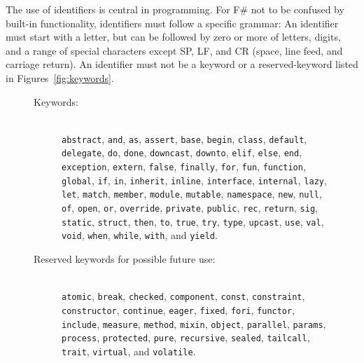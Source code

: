 The use of identifiers is central in programming. For F\# not to be confused by built-in functionality, identifiers must follow a specific grammar: An identifier must start with a letter, but can be followed by zero or more of letters, digits, and a range of special characters except SP, LF, and CR (space, line feed, and carriage return). An identifier must not be a keyword or a reserved-keyword listed in Figures~\ref{fig:keywords}.
\begin{figure}
  \begin{description}
  \item[Keywords:]~\\
    \mbox{\lstinline{abstract},} \mbox{\lstinline{and},} \mbox{\lstinline{as},} \mbox{\lstinline{assert},} \mbox{\lstinline{base},} \mbox{\lstinline{begin},} \mbox{\lstinline{class},} \mbox{\lstinline{default},} \mbox{\lstinline{delegate},} \mbox{\lstinline{do},} \mbox{\lstinline{done},} \mbox{\lstinline{downcast},} \mbox{\lstinline{downto},} \mbox{\lstinline{elif},} \mbox{\lstinline{else},} \mbox{\lstinline{end},} \mbox{\lstinline{exception},} \mbox{\lstinline{extern},} \mbox{\lstinline{false},} \mbox{\lstinline{finally},} \mbox{\lstinline{for},} \mbox{\lstinline{fun},} \mbox{\lstinline{function},} \mbox{\lstinline{global},} \mbox{\lstinline{if},} \mbox{\lstinline{in},} \mbox{\lstinline{inherit},} \mbox{\lstinline{inline},} \mbox{\lstinline{interface},} \mbox{\lstinline{internal},} \mbox{\lstinline{lazy},} \mbox{\lstinline{let},} \mbox{\lstinline{match},} \mbox{\lstinline{member},} \mbox{\lstinline{module},} \mbox{\lstinline{mutable},} \mbox{\lstinline{namespace},} \mbox{\lstinline{new},} \mbox{\lstinline{null},} \mbox{\lstinline{of},} \mbox{\lstinline{open},} \mbox{\lstinline{or},} \mbox{\lstinline{override},} \mbox{\lstinline{private},} \mbox{\lstinline{public},} \mbox{\lstinline{rec},} \mbox{\lstinline{return},} \mbox{\lstinline{sig},} \mbox{\lstinline{static},} \mbox{\lstinline{struct},} \mbox{\lstinline{then},} \mbox{\lstinline{to},} \mbox{\lstinline{true},} \mbox{\lstinline{try},} \mbox{\lstinline{type},} \mbox{\lstinline{upcast},} \mbox{\lstinline{use},} \mbox{\lstinline{val},} \mbox{\lstinline{void},} \mbox{\lstinline{when},} \mbox{\lstinline{while},} \mbox{\lstinline{with},} and \mbox{\lstinline{yield}.}
  \item[Reserved keywords for possible future use:]~\\
    \mbox{\lstinline{atomic},} \mbox{\lstinline{break},} \mbox{\lstinline{checked},} \mbox{\lstinline{component},} \mbox{\lstinline{const},} \mbox{\lstinline{constraint},} \mbox{\lstinline{constructor},} \mbox{\lstinline{continue},} \mbox{\lstinline{eager},} \mbox{\lstinline{fixed},} \mbox{\lstinline{fori},} \mbox{\lstinline{functor},} \mbox{\lstinline{include},} \mbox{\lstinline{measure},} \mbox{\lstinline{method},} \mbox{\lstinline{mixin},} \mbox{\lstinline{object},} \mbox{\lstinline{parallel},} \mbox{\lstinline{params},} \mbox{\lstinline{process},} \mbox{\lstinline{protected},} \mbox{\lstinline{pure},} \mbox{\lstinline{recursive},} \mbox{\lstinline{sealed},} \mbox{\lstinline{tailcall},} \mbox{\lstinline{trait},} \mbox{\lstinline{virtual},} and \mbox{\lstinline{volatile}.}

\end{description}
\end{figure}
